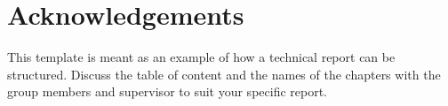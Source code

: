 \chapter*{Acknowledgements}
This template is meant as an example of how a technical report can be structured. Discuss
the table of content and the names of the chapters with the group members and supervisor
to suit your specific report.

